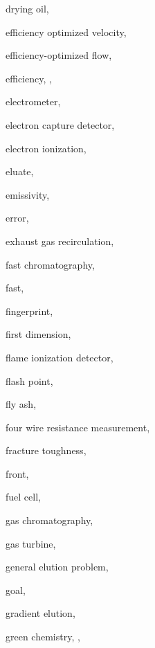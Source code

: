 \begin{theindex}
  \item \lowercase {drying oil}, 
  \item \lowercase {efficiency optimized velocity}, 
  \item \lowercase {efficiency-optimized flow}, 
  \item \lowercase {efficiency}, , 
  \item \lowercase {electrometer}, 
  \item \lowercase {electron capture detector}, 
  \item \lowercase {electron ionization}, 
  \item \lowercase {eluate}, 
  \item \lowercase {emissivity}, 
  \item \lowercase {error}, 
  \item \lowercase {exhaust gas recirculation}, 
  \item \lowercase {fast chromatography}, 
  \item \lowercase {fast}, 
  \item \lowercase {fingerprint}, 
  \item \lowercase {first dimension}, 
  \item \lowercase {flame ionization detector}, 
  \item \lowercase {flash point}, 
  \item \lowercase {fly ash}, 
  \item \lowercase {four wire resistance measurement}, 
  \item \lowercase {fracture toughness}, 
  \item \lowercase {front}, 
  \item \lowercase {fuel cell}, 
  \item \lowercase {gas chromatography}, 
  \item \lowercase {gas turbine}, 
  \item \lowercase {general elution problem}, 
  \item \lowercase {goal}, 
  \item \lowercase {gradient elution}, 
  \item \lowercase {green chemistry}, , 

\end{theindex}
